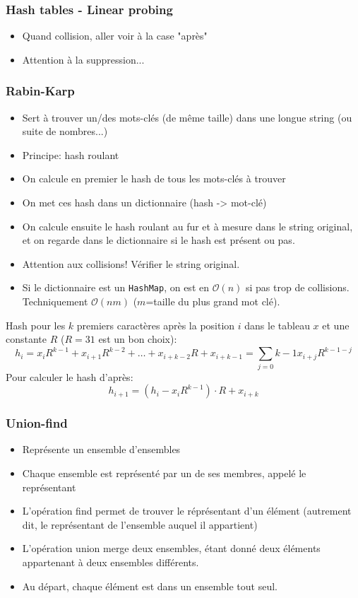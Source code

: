 \documentclass[8pt,aspectratio=169]{beamer}
\begin{document}
\begin{frame}
\frametitle{Hash tables - Linear probing}
\begin{itemize}
	\item Quand collision, aller voir à la case "après"
	\item Attention à la suppression...
\end{itemize}
\end{frame}

\begin{frame}
\frametitle{Rabin-Karp}
\begin{itemize}
	\item Sert à trouver un/des mots-clés (de même taille) dans une longue string (ou suite de nombres...)
	\item Principe: hash roulant
	\item On calcule en premier le hash de tous les mots-clés à trouver
	\item On met ces hash dans un dictionnaire (hash -> mot-clé)
	\item On calcule ensuite le hash roulant au fur et à mesure dans le string original, et on regarde dans le dictionnaire si le hash est présent ou pas.
	\item Attention aux collisions! Vérifier le string original.
	\item Si le dictionnaire est un \texttt{HashMap}, on est en $\mathcal{O}(n)$ si pas trop de collisions. Techniquement $\mathcal{O}(nm)$ ($m$=taille du plus grand mot clé).
\end{itemize}
Hash pour les $k$ premiers caractères après la position $i$ dans le tableau $x$ et une constante $R$ ($R=31$ est un bon choix):
$$h_i = x_i R^{k-1} + x_{i+1} R^{k-2} + \ldots + x_{i+k-2} R + x_{i+k-1} = \sum_{j=0}{k-1} x_{i+j} R^{k-1-j}$$
Pour calculer le hash d'après:
$$h_{i+1} = (h_i - x_i R^{k-1})\cdot R + x_{i+k}$$

\end{frame}

\begin{frame}
\frametitle{Union-find}
\begin{itemize}
	\item Représente un ensemble d'ensembles
	\item Chaque ensemble est représenté par un de ses membres, appelé le représentant
	\item L'opération find permet de trouver le réprésentant d'un élément (autrement dit, le représentant de l'ensemble auquel il appartient)
	\item L'opération union merge deux ensembles, étant donné deux éléments appartenant à deux ensembles différents.
	\item Au départ, chaque élément est dans un ensemble tout seul.
\end{itemize}
\end{frame}
\end{document}
